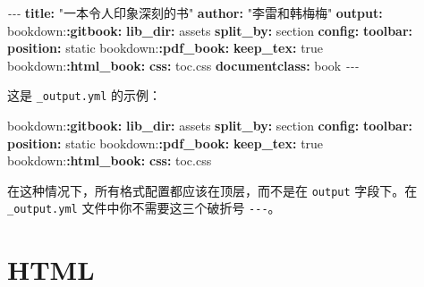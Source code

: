 \documentclass[
  12pt,
]{krantz}
\newenvironment{Shaded}{\begin{snugshade}}{\end{snugshade}}
\newcommand{\AttributeTok}[1]{\textcolor[rgb]{0.13,0.29,0.53}{#1}}
\newcommand{\CharTok}[1]{\textcolor[rgb]{0.31,0.60,0.02}{#1}}
\newcommand{\FunctionTok}[1]{\textcolor[rgb]{0.13,0.29,0.53}{\textbf{#1}}}
\newcommand{\KeywordTok}[1]{\textcolor[rgb]{0.13,0.29,0.53}{\textbf{#1}}}
\newcommand{\PreprocessorTok}[1]{\textcolor[rgb]{0.56,0.35,0.01}{\textit{#1}}}
\newcommand{\StringTok}[1]{\textcolor[rgb]{0.31,0.60,0.02}{#1}}
\theoremstyle{definition}
\theoremstyle{definition}
\theoremstyle{definition}
\theoremstyle{definition}
\theoremstyle{remark}
\begin{document}
\begin{Shaded}
\begin{Highlighting}[]
\PreprocessorTok{{-}{-}{-}}
\FunctionTok{title}\KeywordTok{:}\AttributeTok{ }\StringTok{"一本令人印象深刻的书"}
\FunctionTok{author}\KeywordTok{:}\AttributeTok{ }\StringTok{"李雷和韩梅梅"}
\FunctionTok{output}\KeywordTok{:}
\AttributeTok{  bookdown:}\FunctionTok{:gitbook}\KeywordTok{:}
\AttributeTok{    }\FunctionTok{lib\_dir}\KeywordTok{:}\AttributeTok{ assets}
\AttributeTok{    }\FunctionTok{split\_by}\KeywordTok{:}\AttributeTok{ section}
\AttributeTok{    }\FunctionTok{config}\KeywordTok{:}
\AttributeTok{      }\FunctionTok{toolbar}\KeywordTok{:}
\AttributeTok{        }\FunctionTok{position}\KeywordTok{:}\AttributeTok{ static}
\AttributeTok{  bookdown:}\FunctionTok{:pdf\_book}\KeywordTok{:}
\AttributeTok{    }\FunctionTok{keep\_tex}\KeywordTok{:}\AttributeTok{ }\CharTok{true}
\AttributeTok{  bookdown:}\FunctionTok{:html\_book}\KeywordTok{:}
\AttributeTok{    }\FunctionTok{css}\KeywordTok{:}\AttributeTok{ toc.css}
\FunctionTok{documentclass}\KeywordTok{:}\AttributeTok{ book}
\PreprocessorTok{{-}{-}{-}}
\end{Highlighting}
\end{Shaded}

这是 \texttt{\_output.yml} 的示例：

\begin{Shaded}
\begin{Highlighting}[]
\AttributeTok{bookdown:}\FunctionTok{:gitbook}\KeywordTok{:}
\AttributeTok{  }\FunctionTok{lib\_dir}\KeywordTok{:}\AttributeTok{ assets}
\AttributeTok{  }\FunctionTok{split\_by}\KeywordTok{:}\AttributeTok{ section}
\AttributeTok{  }\FunctionTok{config}\KeywordTok{:}
\AttributeTok{    }\FunctionTok{toolbar}\KeywordTok{:}
\AttributeTok{      }\FunctionTok{position}\KeywordTok{:}\AttributeTok{ static}
\AttributeTok{bookdown:}\FunctionTok{:pdf\_book}\KeywordTok{:}
\AttributeTok{  }\FunctionTok{keep\_tex}\KeywordTok{:}\AttributeTok{ }\CharTok{true}
\AttributeTok{bookdown:}\FunctionTok{:html\_book}\KeywordTok{:}
\AttributeTok{  }\FunctionTok{css}\KeywordTok{:}\AttributeTok{ toc.css}
\end{Highlighting}
\end{Shaded}

在这种情况下，所有格式配置都应该在顶层，而不是在 \texttt{output} 字段下。在 \texttt{\_output.yml} 文件中你不需要这三个破折号 \texttt{-\/-\/-}。

\section{HTML}\label{html}
\end{document}
